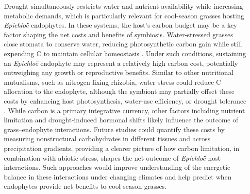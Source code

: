 \documentclass[12pt]{article}\usepackage[]{graphicx}\usepackage[dvipsnames]{xcolor}
\newcommand{\tom}[2]{{\color{red}{#1}}\footnote{\textit{\color{red}{#2}}}}
\begin{document}
Drought simultaneously restricts water and nutrient availability while increasing metabolic demands, which is particularly relevant for cool-season grasses hosting \textit{Epichloë} endophytes. 
In these systems, the host’s carbon budget may be a key factor shaping the net costs and benefits of symbiosis. 
Water-stressed grasses close stomata to conserve water, reducing photosynthetic carbon gain while still expending C to maintain cellular homeostasis \citep{dietze2014nonstructural}. 
Under such conditions, sustaining an \textit{Epichloë} endophyte may represent a relatively high carbon cost, potentially outweighing any growth or reproductive benefits. 
Similar to other nutritional mutualisms, such as nitrogen-fixing rhizobia, water stress could reduce C allocation to the endophyte, although the symbiont may partially offset these costs by enhancing host photosynthesis, water-use efficiency, or drought tolerance \citep{toby2010mutualisms, pringle2016integrating}. 
While carbon is a primary integrative currency, other factors including nutrient limitation and drought-induced hormonal shifts likely influence the outcome of grass–endophyte interactions. 
Future studies could quantify these costs by measuring nonstructural carbohydrates in different tissues and across precipitation gradients, providing a clearer picture of how carbon limitation, in combination with abiotic stress, shapes the net outcome of \textit{Epichloë}-host interactions. 
Such approaches would improve understanding of the energetic balance in these interactions under changing climates and help predict when endophytes provide net benefits to cool-season grasses.
\end{document}
